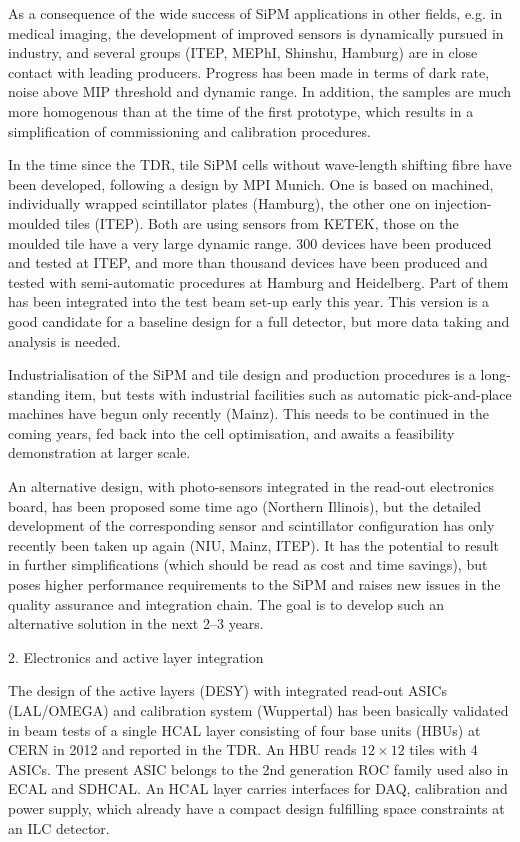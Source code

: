 As a consequence of the wide success of SiPM applications in other fields, e.g. in medical imaging, the development of improved sensors is dynamically pursued in industry, and several groups (ITEP, MEPhI, Shinshu, Hamburg) are in close contact with leading producers. Progress has been made in terms of dark rate, noise above MIP threshold and dynamic range. In addition, the samples are much more homogenous than at the time of the first prototype, which results in a simplification of commissioning and calibration procedures.

In the time since the TDR, tile SiPM cells without wave-length shifting fibre have been developed, following a design by MPI Munich. One is based on machined, individually wrapped scintillator plates (Hamburg), the other one on injection-moulded tiles (ITEP). Both are using sensors from KETEK, those on the moulded tile have a very large dynamic range. 300 devices have been produced and tested at ITEP, and more than thousand devices have been produced and tested with semi-automatic procedures at Hamburg and Heidelberg. Part of them has been integrated into the test beam set-up early this year. This version is a good candidate for a baseline design for a full detector, but more data taking and analysis is needed.

Industrialisation of the SiPM and tile design and production procedures is a long-standing item, but tests with industrial facilities such as automatic pick-and-place machines have begun only recently (Mainz). This needs to be continued in the coming years, fed back into the cell optimisation, and awaits a feasibility demonstration at larger scale.

An alternative design, with photo-sensors integrated in the read-out electronics board, has been proposed some time ago (Northern Illinois), but the detailed development of the corresponding sensor and scintillator configuration has only recently been taken up again (NIU, Mainz, ITEP). It has the potential to result in further simplifications (which should be read as cost and time savings), but poses higher performance requirements to the SiPM and raises new issues in the quality assurance and integration chain. The goal is to develop such an alternative solution in the next 2--3 years.

2.  Electronics and active layer integration

The design of the active layers (DESY) with integrated read-out ASICs (LAL/OMEGA) and calibration system (Wuppertal) has been basically validated in beam tests of a single HCAL layer consisting of four base units (HBUs) at CERN in 2012 and reported in the TDR. An HBU reads $12 \times 12$ tiles with 4 ASICs. The present ASIC belongs to the 2nd generation ROC family used also in ECAL and SDHCAL. An HCAL layer carries interfaces for DAQ, calibration and power supply, which already have a compact design fulfilling space constraints at an ILC detector.

